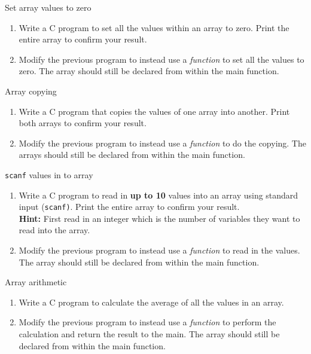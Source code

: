 \documentclass{pass}
\begin{document}
\begin{task}{Set array values to zero}{}
	\begin{enumerate}
	\item Write a C program to set all the values within an array to zero. Print the entire array to confirm your result.\\[6pt]
	\item Modify the previous program to instead use a \textit{function} to set all the values to zero. The array should still be declared from within the main function.
	\end{enumerate}
\end{task}

\begin{task}{Array copying}{}
	\begin{enumerate}
	\item Write a C program that copies the values of one array into another. Print both arrays to confirm your result.\\[6pt]
	\item Modify the previous program to instead use a \textit{function} to do the copying. The arrays should still be declared from within the main function.
	\end{enumerate}
\end{task}

\begin{task}{\texttt{scanf} values in to array}{}
	\begin{enumerate}
	\item Write a C program to read in \textbf{up to 10} values into an array using standard input (\texttt{scanf)}. Print the entire array to confirm your result.\\
\textbf{Hint:} First read in an integer which is the number of variables they want to read into the array.	
	\\[6pt]
	\item Modify the previous program to instead use a \textit{function} to read in the values. The array should still be declared from within the main function.
	\end{enumerate}
\end{task}

\begin{task}{Array arithmetic}{}
	\begin{enumerate}
	\item Write a C program to calculate the average of all the values in an array.\\[6pt]
	\item Modify the previous program to instead use a \textit{function} to perform the calculation and return the result to the main. The array should still be declared from within the main function.
	\end{enumerate}
\end{task}
\end{document}
